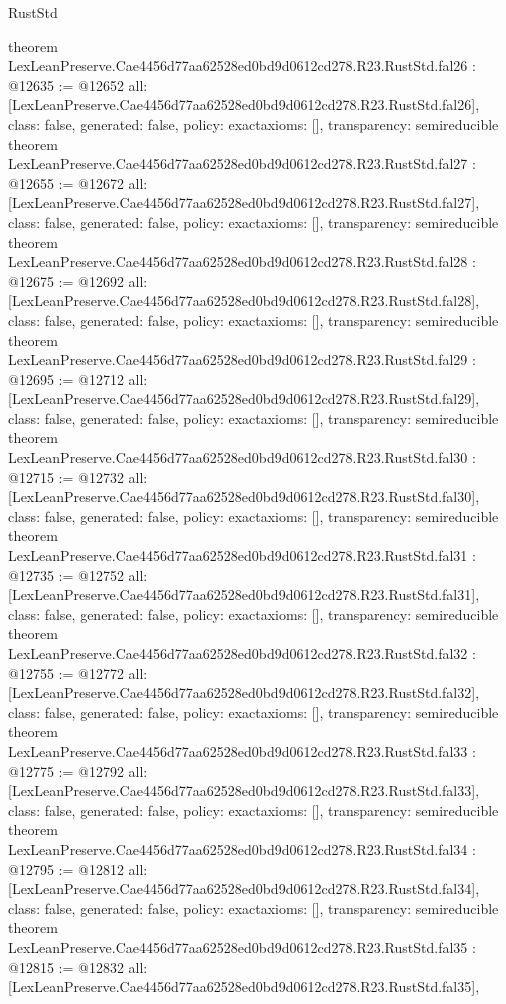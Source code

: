 \begin{lexlean}{RustStd}
\begin{coremodule}
{}
theorem LexLeanPreserve.Cae4456d77aa62528ed0bd9d0612cd278.R23.RustStd.fal26 : @12635 := @12652 {
  all: [LexLeanPreserve.Cae4456d77aa62528ed0bd9d0612cd278.R23.RustStd.fal26],
  class: false,
  generated: false,
  policy: exact{axioms: []},
  transparency: semireducible
}
theorem LexLeanPreserve.Cae4456d77aa62528ed0bd9d0612cd278.R23.RustStd.fal27 : @12655 := @12672 {
  all: [LexLeanPreserve.Cae4456d77aa62528ed0bd9d0612cd278.R23.RustStd.fal27],
  class: false,
  generated: false,
  policy: exact{axioms: []},
  transparency: semireducible
}
theorem LexLeanPreserve.Cae4456d77aa62528ed0bd9d0612cd278.R23.RustStd.fal28 : @12675 := @12692 {
  all: [LexLeanPreserve.Cae4456d77aa62528ed0bd9d0612cd278.R23.RustStd.fal28],
  class: false,
  generated: false,
  policy: exact{axioms: []},
  transparency: semireducible
}
theorem LexLeanPreserve.Cae4456d77aa62528ed0bd9d0612cd278.R23.RustStd.fal29 : @12695 := @12712 {
  all: [LexLeanPreserve.Cae4456d77aa62528ed0bd9d0612cd278.R23.RustStd.fal29],
  class: false,
  generated: false,
  policy: exact{axioms: []},
  transparency: semireducible
}
theorem LexLeanPreserve.Cae4456d77aa62528ed0bd9d0612cd278.R23.RustStd.fal30 : @12715 := @12732 {
  all: [LexLeanPreserve.Cae4456d77aa62528ed0bd9d0612cd278.R23.RustStd.fal30],
  class: false,
  generated: false,
  policy: exact{axioms: []},
  transparency: semireducible
}
theorem LexLeanPreserve.Cae4456d77aa62528ed0bd9d0612cd278.R23.RustStd.fal31 : @12735 := @12752 {
  all: [LexLeanPreserve.Cae4456d77aa62528ed0bd9d0612cd278.R23.RustStd.fal31],
  class: false,
  generated: false,
  policy: exact{axioms: []},
  transparency: semireducible
}
theorem LexLeanPreserve.Cae4456d77aa62528ed0bd9d0612cd278.R23.RustStd.fal32 : @12755 := @12772 {
  all: [LexLeanPreserve.Cae4456d77aa62528ed0bd9d0612cd278.R23.RustStd.fal32],
  class: false,
  generated: false,
  policy: exact{axioms: []},
  transparency: semireducible
}
theorem LexLeanPreserve.Cae4456d77aa62528ed0bd9d0612cd278.R23.RustStd.fal33 : @12775 := @12792 {
  all: [LexLeanPreserve.Cae4456d77aa62528ed0bd9d0612cd278.R23.RustStd.fal33],
  class: false,
  generated: false,
  policy: exact{axioms: []},
  transparency: semireducible
}
theorem LexLeanPreserve.Cae4456d77aa62528ed0bd9d0612cd278.R23.RustStd.fal34 : @12795 := @12812 {
  all: [LexLeanPreserve.Cae4456d77aa62528ed0bd9d0612cd278.R23.RustStd.fal34],
  class: false,
  generated: false,
  policy: exact{axioms: []},
  transparency: semireducible
}
theorem LexLeanPreserve.Cae4456d77aa62528ed0bd9d0612cd278.R23.RustStd.fal35 : @12815 := @12832 {
  all: [LexLeanPreserve.Cae4456d77aa62528ed0bd9d0612cd278.R23.RustStd.fal35],
}
\end{coremodule}
\end{lexlean}
